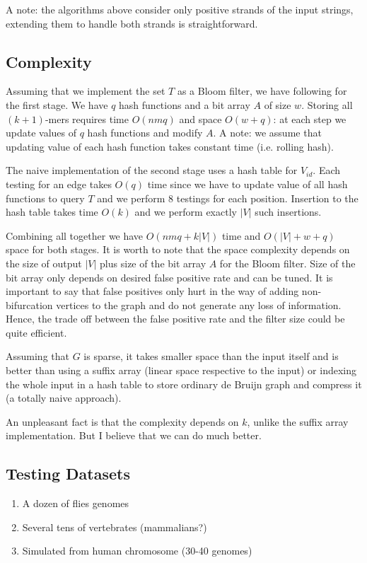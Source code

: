 \documentclass[a4paper, 12pt]{scrartcl}
\begin{document}
A note: the algorithms above consider only positive strands of the input strings, extending them to handle both strands is straightforward.
\subsection{Complexity}
Assuming that we implement the set $T$ as a Bloom filter, we have following for the first stage.
We have $q$ hash functions and a bit array $A$ of size $w$.
Storing all $(k + 1)$-mers requires time $O(nmq)$ and space $O(w + q)$: at each step we update values of $q$ hash functions and modify $A$.
A note: we assume that updating value of each hash function takes constant time (i.e. rolling hash).

The naive implementation of the second stage uses a hash table for $V_{id}$.
Each testing for an edge takes $O(q)$ time since we have to update value of all hash functions to query $T$ and we perform 8 testings for each position.
Insertion to the hash table takes time $O(k)$ and we perform exactly $|V|$ such insertions.

Combining all together we have $O(nmq + k|V|)$ time and $O(|V| + w + q)$ space for both stages. 
It is worth to note that the space complexity depends on the size of output $|V|$ plus size of the bit array $A$ for the Bloom filter.
Size of the bit array only depends on desired false positive rate and can be tuned.
It is important to say that false positives only hurt in the way of adding non-bifurcation vertices to the graph and do not generate any loss of information.
Hence, the trade off between the false positive rate and the filter size could be quite efficient.

Assuming that $G$ is sparse, it takes smaller space than the input itself and is better than using a suffix array (linear space respective to the input) or indexing the whole input in a hash table to store ordinary de Bruijn graph and compress it (a totally naive approach).

An unpleasant fact is that the complexity depends on $k$, unlike the suffix array implementation.
But I believe that we can do much better.

\subsection{Testing Datasets}

\begin{enumerate}
\item A dozen of flies genomes
\item Several tens of vertebrates (mammalians?)
\item Simulated from human chromosome (30-40 genomes)
\end{enumerate}
\end{document}
